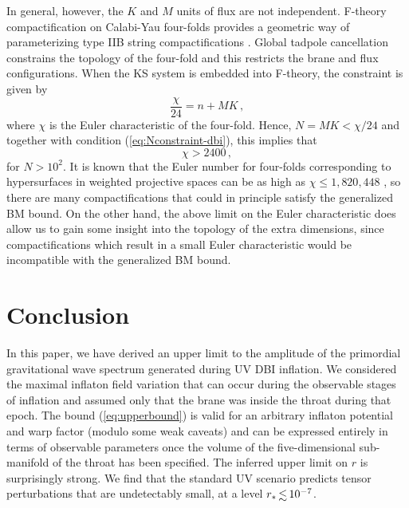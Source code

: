 In general, however, the $K$ and $M$ units of flux are not independent. 
F-theory compactification on Calabi-Yau four-folds
provides a geometric way of parameterizing  
type IIB string compactifications
\cite{witten1,witten2,witten3,sethi,gkp,klemm}. 
Global tadpole cancellation constrains the topology of the four-fold
and this restricts the brane and flux configurations.  
When the KS system is embedded into F-theory, the  
constraint is given by \cite{gkp}
% 
\begin{equation}
\label{eq:Ftheory}
\frac{\chi}{24} = n + MK \,,
\end{equation}
% 
where $\chi$ is the Euler characteristic of the four-fold.  
Hence, $N = MK < \chi /24$ and together with condition 
(\ref{eq:Nconstraint-dbi}), this implies that
% 
\begin{equation}
\label{eq:chilimit}
\chi > 2400 \,,
\end{equation}
% 
for $N > 10^2$.
It is known that the Euler number for four-folds 
corresponding to hypersurfaces in weighted projective spaces
can be as high as $\chi \le 1,820,448$ \cite{klemm},
so there are many compactifications that could 
in principle satisfy the generalized BM bound.
On the other hand, the above limit on the Euler characteristic 
does allow us to gain some insight into the 
topology of the extra dimensions, since compactifications 
which result in a small Euler characteristic would be  
incompatible with the generalized BM bound. 
% 
% 
% 
% 
% 
% 
\section{Conclusion} 
\label{sec:conclusion-dbi}

In this paper, we have derived an upper limit to
the amplitude of the primordial gravitational wave spectrum
generated during UV DBI inflation. We considered   
the maximal inflaton field variation   
that can occur during the observable stages of inflation and assumed  
only that the brane was inside the throat during that epoch. 
The bound (\ref{eq:upperbound}) is valid for an arbitrary inflaton potential and 
warp factor (modulo some weak caveats) and can be expressed 
entirely in terms of observable parameters once the volume of 
the five-dimensional sub-manifold of the throat has been specified. 
The inferred upper limit on $r$ is surprisingly strong. 
We find that the standard UV  
scenario predicts tensor perturbations that are undetectably small, 
at a level ${r_*} \, {\lsim} \, {10^{-7}}$. 

